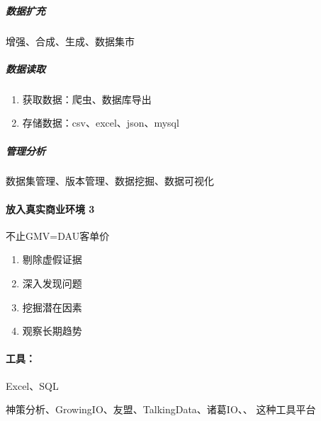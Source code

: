 \documentclass[letterpaper,11pt,english]{sphinxmanual}
\begin{document}
\subparagraph{数据扩充}
\label{\detokenize{chapter_idea/data:id19}}
增强、合成、生成、数据集市


\subparagraph{数据读取}
\label{\detokenize{chapter_idea/data:id20}}\begin{enumerate}
%
\item {} 
获取数据：爬虫、数据库导出

\item {} 
存储数据：csv、excel、json、mysql
%
\begin{footnote}[322]\sphinxAtStartFootnote
{}
%
\end{footnote}

\end{enumerate}


\subparagraph{管理分析}
\label{\detokenize{chapter_idea/data:id21}}
数据集管理、版本管理、数据挖掘、数据可视化


\paragraph{放入真实商业环境 3\sphinxfootnotemark[323]}
\label{\detokenize{chapter_idea/data:id22}}%
\begin{footnotetext}[323]\sphinxAtStartFootnote
{}
%
\end{footnotetext}\ignorespaces 
不止GMV=DAU客单价
\begin{enumerate}
%
\item {} 
剔除虚假证据

\item {} 
深入发现问题

\item {} 
挖掘潜在因素

\item {} 
观察长期趋势

\end{enumerate}


\paragraph{工具：}
\label{\detokenize{chapter_idea/data:id23}}
Excel、SQL

神策分析、GrowingIO、友盟、TalkingData、诸葛IO、、
这种工具平台
\end{document}
